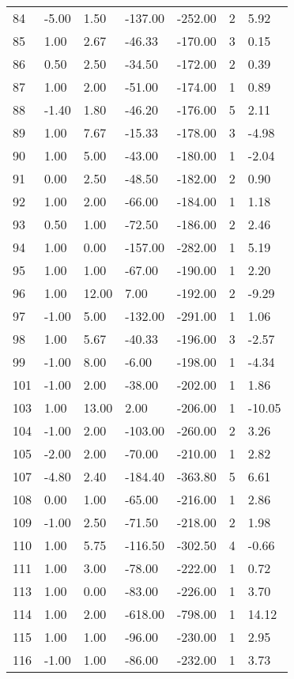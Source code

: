 \begin{appendices}
\begin{longtable}[c]{@{}lllllll@{}}
84 & -5.00 & 1.50 & -137.00 & -252.00 & 2 & 5.92 \\
85 & 1.00 & 2.67 & -46.33 & -170.00 & 3 & 0.15 \\
86 & 0.50 & 2.50 & -34.50 & -172.00 & 2 & 0.39 \\
87 & 1.00 & 2.00 & -51.00 & -174.00 & 1 & 0.89 \\
88 & -1.40 & 1.80 & -46.20 & -176.00 & 5 & 2.11 \\
89 & 1.00 & 7.67 & -15.33 & -178.00 & 3 & -4.98 \\
90 & 1.00 & 5.00 & -43.00 & -180.00 & 1 & -2.04 \\
91 & 0.00 & 2.50 & -48.50 & -182.00 & 2 & 0.90 \\
92 & 1.00 & 2.00 & -66.00 & -184.00 & 1 & 1.18 \\
93 & 0.50 & 1.00 & -72.50 & -186.00 & 2 & 2.46 \\
94 & 1.00 & 0.00 & -157.00 & -282.00 & 1 & 5.19 \\
95 & 1.00 & 1.00 & -67.00 & -190.00 & 1 & 2.20 \\
96 & 1.00 & 12.00 & 7.00 & -192.00 & 2 & -9.29 \\
97 & -1.00 & 5.00 & -132.00 & -291.00 & 1 & 1.06 \\
98 & 1.00 & 5.67 & -40.33 & -196.00 & 3 & -2.57 \\
99 & -1.00 & 8.00 & -6.00 & -198.00 & 1 & -4.34 \\
101 & -1.00 & 2.00 & -38.00 & -202.00 & 1 & 1.86 \\
103 & 1.00 & 13.00 & 2.00 & -206.00 & 1 & -10.05 \\
104 & -1.00 & 2.00 & -103.00 & -260.00 & 2 & 3.26 \\
105 & -2.00 & 2.00 & -70.00 & -210.00 & 1 & 2.82 \\
107 & -4.80 & 2.40 & -184.40 & -363.80 & 5 & 6.61 \\
108 & 0.00 & 1.00 & -65.00 & -216.00 & 1 & 2.86 \\
109 & -1.00 & 2.50 & -71.50 & -218.00 & 2 & 1.98 \\
110 & 1.00 & 5.75 & -116.50 & -302.50 & 4 & -0.66 \\
111 & 1.00 & 3.00 & -78.00 & -222.00 & 1 & 0.72 \\
113 & 1.00 & 0.00 & -83.00 & -226.00 & 1 & 3.70 \\
114 & 1.00 & 2.00 & -618.00 & -798.00 & 1 & 14.12 \\
115 & 1.00 & 1.00 & -96.00 & -230.00 & 1 & 2.95 \\
116 & -1.00 & 1.00 & -86.00 & -232.00 & 1 & 3.73 \\

\end{longtable}
\end{appendices}

